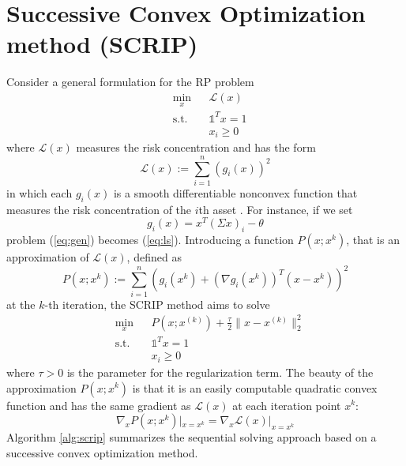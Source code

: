 \section{Successive Convex Optimization method (SCRIP)}
Consider a general formulation for the RP problem
\begin{equation}\label{eq:gen}
\begin{aligned}
& \underset{x}{\text{min}}
&& \mathcal{L}(x)\\
& \text{s.t.}
&&\mathds{1}^T x = 1\\
&&&x_i \geq 0
\end{aligned}
\end{equation}
where $\mathcal{L}(x)$ measures the risk concentration and has the form
\begin{equation}
\mathcal{L}(x) := \sum_{i=1}^n (g_i(x))^2
\end{equation}
in which each $g_i(x)$ is a smooth differentiable nonconvex
function that measures the risk concentration of the $i$th asset \cite{scrip}. For instance, if we set
\begin{equation}
g_i(x) = x^T (\Sigma x)_i - \theta
\end{equation}
problem (\ref{eq:gen}) becomes (\ref{eq:ls}). Introducing a function $P(x;x^{k})$, that is an approximation of $\mathcal{L}(x)$, defined as
\begin{equation}
P(x;x^{k}) := \sum_{i=1}^n (g_i(x^{k}) + (\nabla g_i(x^{k}))^T (x-x^{k}))^2
\end{equation}
at the $k$-th iteration, the SCRIP method aims to solve 
\begin{equation}\label{eq:scrip1}
\begin{aligned}
& \underset{x}{\text{min}}
&&P(x;x^{(k)}) + \frac{\tau}{2}\parallel x - x^{(k)} \parallel^2_2\\
& \text{s.t.}
&&\mathds{1}^T x = 1\\
&&&x_i \geq 0
\end{aligned}
\end{equation}
where $\tau > 0$ is the parameter for the regularization term. The beauty of the approximation $P(x;x^{k})$ is that it is an
easily computable quadratic convex function and has the same
gradient as $\mathcal{L}(x)$ at each iteration point $x^{k}$:
\begin{equation}
\nabla_x P(x;x^{k})|_{x=x^{k}} = \nabla_x \mathcal{L}(x)|_{x=x^{k}}
\end{equation}
Algorithm \ref{alg:scrip} summarizes the sequential solving approach based on a successive convex optimization method.

